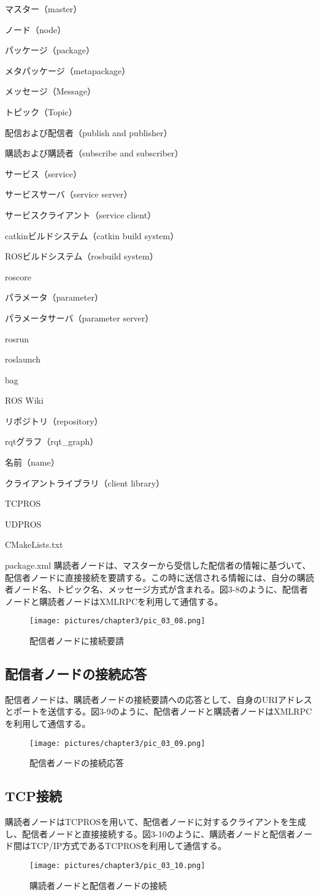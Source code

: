 \begin{term}{マスター（master）}
\begin{term}{ノード（node）}
\begin{term}{パッケージ（package）}
\begin{term}{メタパッケージ（metapackage）}
\begin{term}{メッセージ（Message）}
\begin{term}{トピック（Topic）}
\begin{term}{配信および配信者（publish and publisher）}
\begin{term}{購読および購読者（subscribe and subscriber）}
\begin{term}{サービス（service）}
\begin{term}{サービスサーバ（service server）}
\begin{term}{サービスクライアント（service client）}
\begin{term}{catkinビルドシステム（catkin build system）}
\begin{term}{ROSビルドシステム（rosbuild system）}
\begin{term}{roscore}
\begin{term}{パラメータ（parameter）}
\begin{term}{パラメータサーバ（parameter server）}
\begin{term}{rosrun}
\begin{term}{roslaunch}
\begin{term}{bag}
\begin{term}{ROS Wiki}
\begin{term}{リポジトリ（repository）}
\begin{term}{rqtグラフ（rqt\_graph）}
\begin{term}{名前（name）}
\begin{term}{クライアントライブラリ（client library）}
\begin{term}{TCPROS}
\begin{term}{UDPROS}
\begin{term}{CMakeLists.txt}
\begin{term}{package.xml}
購読者ノードは、マスターから受信した配信者の情報に基づいて、配信者ノードに直接接続を要請する。この時に送信される情報には、自分の購読者ノード名、トピック名、メッセージ方式が含まれる。図3-8のように、配信者ノードと購読者ノードはXMLRPCを利用して通信する。

\begin{figure}[h]
  \centering
  \texttt{[image: pictures/chapter3/pic\_03\_08.png]}
  \caption{配信者ノードに接続要請}
\end{figure}

\subsection{配信者ノードの接続応答}

配信者ノードは、購読者ノードの接続要請への応答として、自身のURIアドレスとポートを送信する。図3-9のように、配信者ノードと購読者ノードはXMLRPCを利用して通信する。

\begin{figure}[h]
  \centering
  \texttt{[image: pictures/chapter3/pic\_03\_09.png]}
  \caption{配信者ノードの接続応答}
\end{figure}

\subsection{TCP接続}

購読者ノードはTCPROSを用いて、配信者ノードに対するクライアントを生成し、配信者ノードと直接接続する。図3-10のように、購読者ノードと配信者ノード間はTCP/IP方式であるTCPROSを利用して通信する。

\begin{figure}[h]
  \centering
  \texttt{[image: pictures/chapter3/pic\_03\_10.png]}
  \caption{購読者ノードと配信者ノードの接続}
\end{figure}


\end{term}
\end{term}
\end{term}
\end{term}
\end{term}
\end{term}
\end{term}
\end{term}
\end{term}
\end{term}
\end{term}
\end{term}
\end{term}
\end{term}
\end{term}
\end{term}
\end{term}
\end{term}
\end{term}
\end{term}
\end{term}
\end{term}
\end{term}
\end{term}
\end{term}
\end{term}
\end{term}
\end{term}

